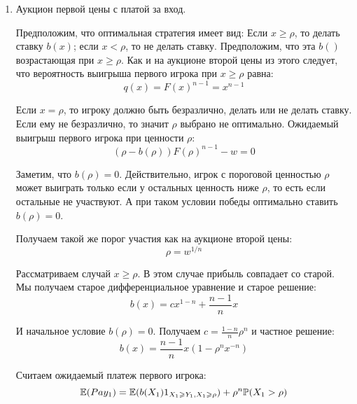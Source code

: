 \begin{enumerate}
\item Аукцион первой цены с платой за вход.

Предположим, что оптимальная стратегия имеет вид: Если $ x\geq \rho $, то делать ставку $ b(x) $; если $ x<\rho $, то не делать ставку. Предположим, что эта $ b() $ возрастающая при $ x\geq \rho $. Как и на аукционе второй цены из этого следует, что вероятность выигрыша первого игрока при $ x\geq\rho $ равна:
\begin{equation}
q(x)=F(x)^{n-1}=x^{n-1}
\end{equation}


Если $ x=\rho $, то игроку должно быть безразлично, делать или не делать ставку. Если ему не безразлично, то значит $ \rho $ выбрано не оптимально. Ожидаемый выигрыш первого игрока при ценности $ \rho $:
\begin{equation}
(\rho-b(\rho))F(\rho)^{n-1}-w=0
\end{equation}

Заметим, что $ b(\rho)=0 $. Действительно, игрок с пороговой ценностью $ \rho $ может выиграть только если у остальных ценность ниже $ \rho $, то есть если остальные не участвуют. А при таком условии победы оптимально ставить $ b(\rho)=0 $.

Получаем такой же порог участия как на аукционе второй цены:
\begin{equation}
\rho=w^{1/n}
\end{equation}

Рассматриваем случай $ x\geq \rho $. В этом случае прибыль совпадает со старой. Мы получаем старое дифференциальное уравнение и старое решение:
\begin{equation}
b(x)=cx^{1-n}+\frac{n-1}{n}x
\end{equation}

И начальное условие $ b(\rho)=0 $. Получаем $ c=\frac{1-n}{n}\rho^{n} $ и частное решение:
\begin{equation}
b(x)=\frac{n-1}{n}x(1-\rho^{n}x^{-n})
\end{equation}

Считаем ожидаемый платеж первого игрока:
\begin{equation}
\mathbb{E}(Pay_{1})=\mathbb{E}(b(X_{1})1_{X_{1}\geqslant Y_{1},X_{1}\geqslant \rho})+\rho^{n}\mathbb{P}(X_{1}>\rho)
\end{equation}


\end{enumerate}
